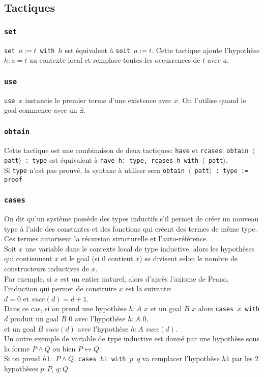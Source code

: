    \subsection{Tactiques}
    \subsubsection{\texttt{set}}
    \texttt{set $a := t$ with $h$} est équivalent à \texttt{soit $a := t$}. Cette tactique ajoute l'hypothèse $h : a = t$ au contexte local et remplace toutes les occurrences de $t$ avec $a$.
    \subsubsection{\texttt{use}}
    \texttt{use $x$} instancie le premier terme d'une existence avec $x$. On l'utilise quand le goal commence avec un $\exists$. 
    \subsubsection{\texttt{obtain}}
    Cette tactique est une combinaison de deux tactiques: \texttt{have} et \texttt{rcases}.
    \texttt{obtain $\langle$ patt$\rangle$ : type} est équivalent à \texttt{have h: type, rcases h with $\langle$ patt$\rangle$}. \\ Si \texttt{type} n'est pas prouvé, la syntaxe à utiliser sera \texttt{obtain $\langle$ patt$\rangle$ : type := proof}
    \subsubsection{\texttt{cases}}
    On dit qu'un système possède des types inductifs s'il permet de créer un nouveau type à l'aide des constantes et des fonctions qui créent des termes de même type. Ces termes autorisent la récursion structurelle et l'auto-référence. \\
    Soit $x$ une variable dans le contexte local de type inductive, alors les hypothèses qui contiennent $x$ et le goal (si il contient $x$) se divisent selon le nombre de constructeurs inductives de $x$.\\ Par exemple, si $x$ est un entier naturel, alors d'après l'axiome de Peano, l'induction qui permet de construire $x$ est la suivante:\\ $d=0$ et $succ(d)=d+1$. \\ Dans ce cas, si on prend une hypothèse $h:A$ $x$ et un goal $B$ $x$ alors \texttt{cases $x$ with $d$} produit un goal $B$ $0$ avec l'hypothèse $h:A$ $0$, \\et un goal $B$ $succ(d)$ avec l'hypothèse $h:A$ $succ(d)$. \\
    Un autre exemple de variable de type inductive est donné par une hypothèse sous la forme $P\wedge Q$ ou bien $P\leftrightarrow Q$.\\ Si on prend $h1:$ $P\wedge Q$, \texttt{cases $h1$ with $p$ $q$} va remplacer l'hypothèse $h1$ par les 2 hypothèses $p:P$, $q:Q$.
